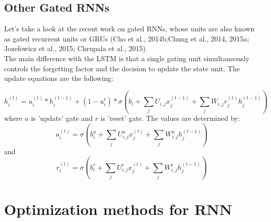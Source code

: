 \subsection{Other Gated RNNs}
Let's take a look at the recent work on gated RNNs, whose units are also known as gated recurrent units or GRUs (Cho et al., 2014b;Chung et al., 2014, 2015a; Jozefowicz et al., 2015; Chrupala et al., 2015). \\
The main difference with the LSTM is that a single gating unit simultaneously controls the forgetting factor and the decision to update the state unit. The update equations are the following:

\begin{equation}
h_i^{(t)} = u_i^{(t)} \ast h_i^{(t-1)} + (1 - u_i^{t}) \ast \sigma(b_i + \sum_jU_{i,j}x_j^{(t-1)} + \sum_jW_{i,j}r_j^{(t)}h_j^{(t-1)})
\end{equation}
where $u$ is 'update' gate and $r$ is 'reset' gate. The values are determined by:
\begin{equation}
u_i^{(t)} = \sigma(b_i^u + \sum_jU_{i,j}^ux_j^{(t)} + \sum_jW_{i,j}^uh_j^{(t-1)})
\end{equation}
and
\begin{equation}
r_i^{(t)} = \sigma(b_i^r + \sum_jU_{i,j}^rx_j^{(t)} + \sum_jW_{i,j}^rh_j^{(t-1)})
\end{equation}
\section{Optimization methods for RNN}
